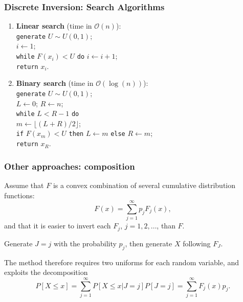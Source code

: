 \documentclass[aspectratio=169]{beamer}
\def\blue{\color{blue}}
\begin{document}
	\begin{frame}
		\frametitle{Discrete Inversion: Search Algorithms}
		
		\begin{enumerate}
			\item \textbf{\blue Linear search} (time in $\mathcal{O}(n)$): \\
			\texttt{generate} $U \sim U (0, 1)$; \\
			$i \leftarrow 1$; \\
			\texttt{while} $F (x_i) < U$ \texttt{do} $i \leftarrow i + 1$; \\
			\texttt{return} $x_i$.

			\vspace{0.5cm}
			
			\item \textbf{\blue Binary search} (time in $\mathcal{O}(\log(n))$): \\
			\texttt{generate} $U \sim U (0, 1)$; \\
			$L \leftarrow 0$; $R \leftarrow n$; \\
			\texttt{while} $L < R - 1$ \texttt{do} \\
			\quad $m \leftarrow \lfloor (L + R)/2 \rfloor$; \\
			\quad \texttt{if} $F (x_m) < U$ \texttt{then} $L \leftarrow m$ \texttt{else} $R \leftarrow m$; \\
			\texttt{return} $x_R$.
		\end{enumerate}
		
	\end{frame}
	
	\begin{frame}
		\frametitle{Other approaches: composition}
		
		Assume that $F$ is a convex combination of several cumulative
		distribution functions:
		\[
		F (x) = \sum_{j = 1}^{\infty} p_j F_j (x),
		\]
		and that it is easier to invert each $F_j$, $j = 1, 2, \ldots$, than $F$.
		
		\mbox{}
		
		Generate $J = j$ with the probability $p_j$, then generate $X$
		following $F_J$.
		
		\mbox{}
		
		The method therefore requires two uniforms for each random variable,
		and exploits the decomposition
		\[
		P[ X \leq x ] = \sum_{j = 1}^{\infty} P[ X \leq x | J = j] P[J = j] = \sum_{j = 1}^{\infty} F_j(x)p_j.
		\]
		
	\end{frame}
	
\end{document}
